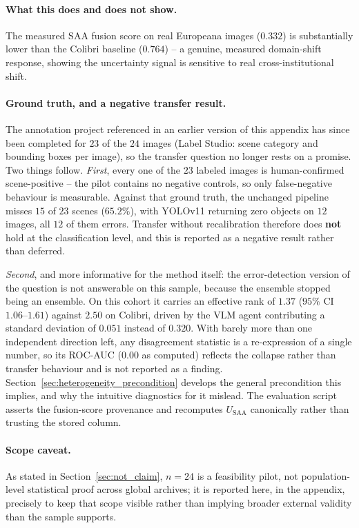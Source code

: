 \documentclass[12pt,a4paper]{report}
\begin{document}
\paragraph{What this does and does not show.} The measured SAA fusion score on real Europeana images ($0.332$) is substantially lower than the Colibri baseline ($0.764$) -- a genuine, measured domain-shift response, showing the uncertainty signal is sensitive to real cross-institutional shift.

\paragraph{Ground truth, and a negative transfer result.} The annotation project referenced in an earlier version of this appendix has since been completed for $23$ of the $24$ images (Label Studio: scene category and bounding boxes per image), so the transfer question no longer rests on a promise. Two things follow. \emph{First}, every one of the $23$ labeled images is human-confirmed scene-positive -- the pilot contains no negative controls, so only false-negative behaviour is measurable. Against that ground truth, the unchanged pipeline misses $15$ of $23$ scenes ($65.2\%$), with YOLOv11 returning zero objects on $12$ images, all $12$ of them errors. Transfer without recalibration therefore does \textbf{not} hold at the classification level, and this is reported as a negative result rather than deferred.

\emph{Second}, and more informative for the method itself: the error-detection version of the question is not answerable on this sample, because the ensemble stopped being an ensemble. On this cohort it carries an effective rank of $1.37$ ($95\%$ CI $1.06$--$1.61$) against $2.50$ on Colibri, driven by the VLM agent contributing a standard deviation of $0.051$ instead of $0.320$. With barely more than one independent direction left, any disagreement statistic is a re-expression of a single number, so its ROC-AUC ($0.00$ as computed) reflects the collapse rather than transfer behaviour and is not reported as a finding. Section~\ref{sec:heterogeneity_precondition} develops the general precondition this implies, and why the intuitive diagnostics for it mislead. The evaluation script asserts the fusion-score provenance and recomputes $U_{\text{SAA}}$ canonically rather than trusting the stored column.

\paragraph{Scope caveat.} As stated in Section~\ref{sec:not_claim}, $n=24$ is a feasibility pilot, not population-level statistical proof across global archives; it is reported here, in the appendix, precisely to keep that scope visible rather than implying broader external validity than the sample supports.
\end{document}
